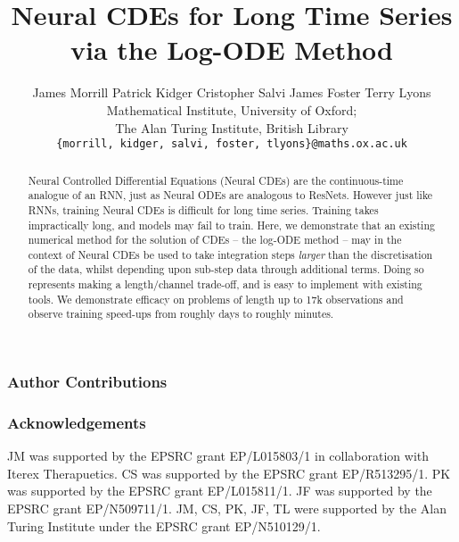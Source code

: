 \documentclass{article} %
\title{Neural CDEs for Long Time Series via the Log-ODE Method}
\author{James Morrill \And Patrick Kidger \And Cristopher Salvi  \And James Foster \And Terry Lyons\AND\\[-20pt]
Mathematical Institute, University of Oxford;\\
The Alan Turing Institute, British Library\\[2pt]
\texttt{\{morrill, kidger, salvi, foster, tlyons\}@maths.ox.ac.uk}
}
\begin{document}
\maketitle

\begin{abstract}
Neural Controlled Differential Equations (Neural CDEs) are the continuous-time analogue of an RNN, just as Neural ODEs are analogous to ResNets. However just like RNNs, training Neural CDEs is difficult for long time series. Training takes impractically long, and models may fail to train. Here, we demonstrate that an existing numerical method for the solution of CDEs -- the log-ODE method -- may in the context of Neural CDEs be used to take integration steps \emph{larger} than the discretisation of the data, whilst depending upon sub-step data through additional terms. Doing so represents making a length/channel trade-off, and is easy to implement with existing tools. We demonstrate efficacy on problems of length up to 17k observations and observe training speed-ups from roughly days to roughly minutes.
\end{abstract}















\subsubsection*{Author Contributions}


\subsubsection*{Acknowledgements}
JM was supported by the EPSRC grant EP/L015803/1 in collaboration
with Iterex Therapuetics. CS was supported by the
EPSRC grant EP/R513295/1. PK was supported by the EPSRC grant EP/L015811/1. JF was supported by the EPSRC grant EP/N509711/1. JM, CS, PK, JF, TL were supported by the Alan Turing Institute under the EPSRC grant EP/N510129/1.





\newpage


\end{document}
